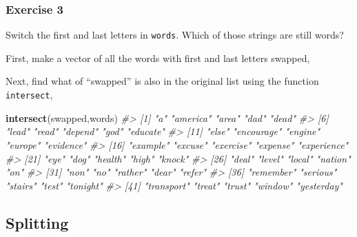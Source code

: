 \documentclass[]{book}
\newenvironment{Shaded}{\begin{snugshade}}{\end{snugshade}}
\newcommand{\CharTok}[1]{\textcolor[rgb]{0.31,0.60,0.02}{#1}}
\newcommand{\CommentTok}[1]{\textcolor[rgb]{0.56,0.35,0.01}{\textit{#1}}}
\newcommand{\KeywordTok}[1]{\textcolor[rgb]{0.13,0.29,0.53}{\textbf{#1}}}
\newcommand{\NormalTok}[1]{#1}
\newcommand{\StringTok}[1]{\textcolor[rgb]{0.31,0.60,0.02}{#1}}
\theoremstyle{definition}
\theoremstyle{definition}
\theoremstyle{definition}
\theoremstyle{remark}
\begin{document}
\hypertarget{exercise-3-25}{%
\subsubsection{Exercise 3}\label{exercise-3-25}}

Switch the first and last letters in \texttt{words}. Which of those
strings are still words?

First, make a vector of all the words with first and last letters
swapped,

\begin{Shaded}
\end{Shaded}

Next, find what of ``swapped'' is also in the original list using the
function \texttt{intersect},

\begin{Shaded}
\begin{Highlighting}[]
\KeywordTok{intersect}\NormalTok{(swapped,words)}
\CommentTok{#>  [1] "a"          "america"    "area"       "dad"        "dead"      }
\CommentTok{#>  [6] "lead"       "read"       "depend"     "god"        "educate"   }
\CommentTok{#> [11] "else"       "encourage"  "engine"     "europe"     "evidence"  }
\CommentTok{#> [16] "example"    "excuse"     "exercise"   "expense"    "experience"}
\CommentTok{#> [21] "eye"        "dog"        "health"     "high"       "knock"     }
\CommentTok{#> [26] "deal"       "level"      "local"      "nation"     "on"        }
\CommentTok{#> [31] "non"        "no"         "rather"     "dear"       "refer"     }
\CommentTok{#> [36] "remember"   "serious"    "stairs"     "test"       "tonight"   }
\CommentTok{#> [41] "transport"  "treat"      "trust"      "window"     "yesterday"}
\end{Highlighting}
\end{Shaded}

\hypertarget{splitting}{%
\subsection{Splitting}\label{splitting}}
\end{document}

